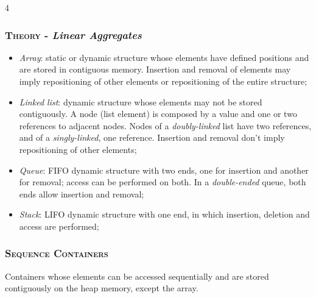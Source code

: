 \documentclass[10pt]{article}
\begin{document}
\begin{multicols*}{4}
{\subsubsection*{\textsc{Theory} - \emph{Linear Aggregates}} 

\begin{itemize}[leftmargin=*,topsep=0.25pt]
  \setlength\itemsep{-1.8pt}
	\item \emph{Array}: static or dynamic structure whose elements have defined positions and are stored in contiguous memory. Insertion and removal of elements may imply repositioning of other elements or repositioning of the entire structure; 
	\item \emph{Linked list}: dynamic structure whose elements may not be stored contiguously. A node (list element) is composed by a value and one or two references to adjacent nodes. Nodes of a \emph{doubly-linked} list have two references, and of a \emph{singly-linked}, one reference. Insertion and removal don't imply repositioning of other elements;
	\item \emph{Queue}: FIFO dynamic structure with two ends, one for insertion and another for removal; access can be performed on both. In a \emph{double-ended} queue, both ends allow insertion and removal;  
	\item \emph{Stack}: LIFO dynamic structure with one end, in which insertion, deletion and access are performed;
\end{itemize}

\subsubsection*{\textsc{Sequence Containers}} 
\noindent
Containers whose elements can be accessed sequentially and are stored contiguously on the heap memory, except the array.

}
\end{multicols*}
\end{document}
